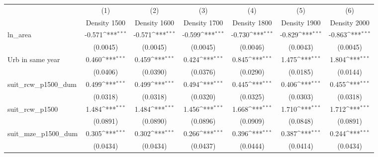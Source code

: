 {
\def\sym#1{\ifmmode^{#1}\else\(^{#1}\)\fi}
\begin{tabular}{l*{6}{c}}
\toprule
                    &\multicolumn{1}{c}{(1)}&\multicolumn{1}{c}{(2)}&\multicolumn{1}{c}{(3)}&\multicolumn{1}{c}{(4)}&\multicolumn{1}{c}{(5)}&\multicolumn{1}{c}{(6)}\\
                    &\multicolumn{1}{c}{Density 1500}&\multicolumn{1}{c}{Density 1600}&\multicolumn{1}{c}{Density 1700}&\multicolumn{1}{c}{Density 1800}&\multicolumn{1}{c}{Density 1900}&\multicolumn{1}{c}{Density 2000}\\
\midrule
ln\_area             &      -0.571\sym{***}&      -0.571\sym{***}&      -0.599\sym{***}&      -0.730\sym{***}&      -0.829\sym{***}&      -0.863\sym{***}\\
                    &    (0.0045)         &    (0.0045)         &    (0.0045)         &    (0.0046)         &    (0.0043)         &    (0.0045)         \\
\addlinespace
Urb in same year    &       0.460\sym{***}&       0.459\sym{***}&       0.424\sym{***}&       0.845\sym{***}&       1.475\sym{***}&       1.804\sym{***}\\
                    &    (0.0406)         &    (0.0390)         &    (0.0376)         &    (0.0290)         &    (0.0185)         &    (0.0144)         \\
\addlinespace
suit\_rcw\_p1500\_dum  &       0.499\sym{***}&       0.499\sym{***}&       0.494\sym{***}&       0.445\sym{***}&       0.406\sym{***}&       0.455\sym{***}\\
                    &    (0.0318)         &    (0.0318)         &    (0.0320)         &    (0.0325)         &    (0.0303)         &    (0.0318)         \\
\addlinespace
suit\_rcw\_p1500      &       1.484\sym{***}&       1.484\sym{***}&       1.456\sym{***}&       1.668\sym{***}&       1.710\sym{***}&       1.712\sym{***}\\
                    &    (0.0891)         &    (0.0890)         &    (0.0896)         &    (0.0909)         &    (0.0848)         &    (0.0891)         \\
\addlinespace
suit\_mze\_p1500\_dum  &       0.305\sym{***}&       0.302\sym{***}&       0.266\sym{***}&       0.396\sym{***}&       0.387\sym{***}&       0.244\sym{***}\\
                    &    (0.0434)         &    (0.0434)         &    (0.0437)         &    (0.0444)         &    (0.0414)         &    (0.0434)         \\

\end{tabular}}
